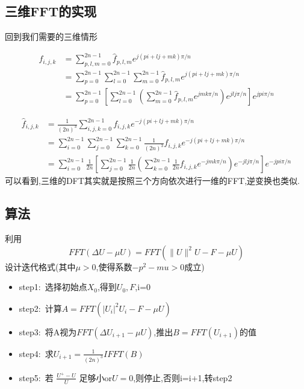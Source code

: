 \documentclass[UTF8]{ctexart}
\begin{document}
\subsection{三维FFT的实现}
回到我们需要的三维情形

\begin{equation}
 \begin{split}
f_{i,j,k} & = \sum\limits_{p,l,m=0}^{2n-1}\hat{f}_{p,l,m} e^{j(pi+lj+mk)\pi/n} \\
 &= \sum\limits_{p=0}^{2n-1} \sum\limits_{l=0}^{2n-1} \sum\limits_{m=0}^{2n-1}\hat{f}_{p,l,m} e^{j(pi+lj+mk)\pi/n} \\
 &= \sum\limits_{p=0}^{2n-1} \left[\sum\limits_{l=0}^{2n-1} \left(\sum\limits_{m=0}^{2n-1}\hat{f}_{p,l,m} e^{jmk\pi/n}\right) e^{jlj\pi/n} \right] e^{jpi\pi/n}
 \end{split}
\end{equation}

\begin{equation}
 \begin{split}
\hat{f}_{i,j,k} & = \frac{1}{(2n)^3}\sum\limits_{i,j,k=0}^{2n-1}f_{i,j,k} e^{-j(pi+lj+mk)\pi/n} \\
 &= \sum\limits_{i=0}^{2n-1} \sum\limits_{j=0}^{2n-1} \sum\limits_{k=0}^{2n-1} \frac{1}{(2n)^3}f_{i,j,k} e^{-j(pi+lj+mk)\pi/n} \\
 &= \sum\limits_{i=0}^{2n-1} \frac{1}{2n} \left[\sum\limits_{j=0}^{2n-1} \frac{1}{2n} \left(\sum\limits_{k=0}^{2n-1} \frac{1}{2n} f_{i,j,k} e^{-jmk\pi/n}\right) e^{-jlj\pi/n} \right] e^{-jpi\pi/n}
 \end{split}
\end{equation}
可以看到,三维的DFT其实就是按照三个方向依次进行一维的FFT,逆变换也类似.

\subsection{算法}
利用
$$
FFT(\Delta U -\mu U) = FFT(\|U\|^2U-F-\mu U)
$$
设计迭代格式(其中$\mu>0$,使得系数$-p^2-mu>0$成立)
\begin{itemize}
  \item step1:\ 选择初始点$X_0$,得到$U_0,F$,i=0
  \item step2:\ 计算$A=FFT(|U_i|^2U_i-F-\mu U)$
  \item step3:\ 将A视为$FFT(\Delta U_{i+1}-\mu U)$,推出$B=FFT(U_{i+1})$的值
  \item step4:\ 求$U_{i+1}=\frac{1}{(2n)^3}IFFT(B)$
  \item step5:\ 若 $\frac{U^{+}-U}{U}$ 足够小or$U=0$,则停止,否则i=i+1,转step2
\end{itemize}
\end{document}
